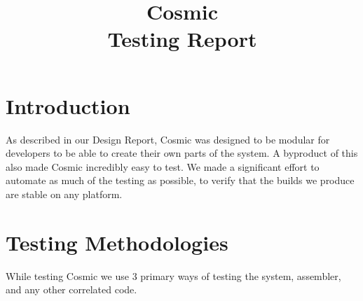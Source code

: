 \documentclass[conference]{IEEEtran}
\begin{document}
\title{
 Cosmic\\Testing Report}

\author{
\and
{}

}

\maketitle

\section{Introduction}
As described in our Design Report, Cosmic was designed to be modular for developers to be able to create their own parts of the system. A byproduct of this also made Cosmic incredibly easy to test. We made a significant effort to automate as much of the testing as possible, to verify that the builds we produce are stable on any platform. 
\section{Testing Methodologies}
While testing Cosmic we use 3 primary ways of testing the system, assembler, and any other correlated code.
\end{document}
